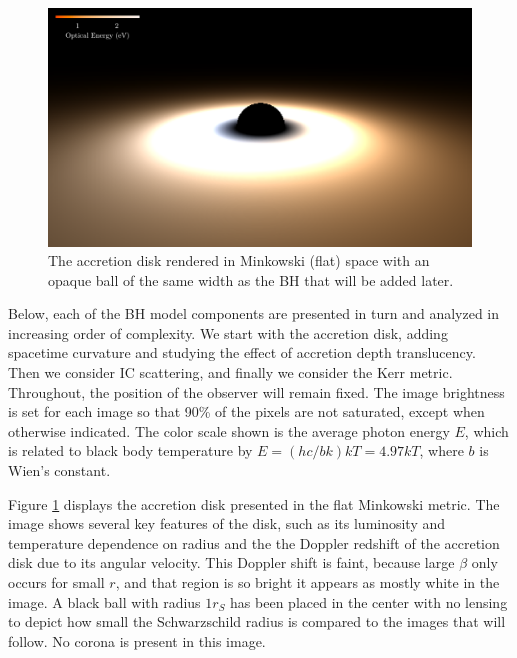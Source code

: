\documentclass[twocolumn,twocolappendix]{aastex631}
\begin{document}
\begin{figure}[htbp!]
  \centering
  \includegraphics[width=\linewidth]{../imager/small/minkowski-optical.pdf}
  \caption{The accretion disk rendered in Minkowski (flat) space with an opaque ball of the same width as the BH that will be added later.}
  \label{fig:mink}
\end{figure}

Below, each of the BH model components are presented in turn and analyzed in increasing order of complexity. We start with the accretion disk, adding spacetime curvature and studying the effect of accretion depth translucency. Then we consider IC scattering, and finally we consider the Kerr metric. Throughout, the position of the observer will remain fixed. The image brightness is set for each image so that 90\% of the pixels are not saturated, except when otherwise indicated. The color scale shown is the average photon energy $E$, which is related to black body temperature by $E = (hc/bk)kT = 4.97 kT$, where $b$ is Wien's constant.

Figure \ref{fig:mink} displays the accretion disk presented in the flat Minkowski metric. The image shows several key features of the disk, such as its luminosity and temperature dependence on radius and the the Doppler redshift of the accretion disk due to its angular velocity. This Doppler shift is faint, because large $\beta$ only occurs for small $r$, and that region is so bright it appears as mostly white in the image. A black ball with radius $1 r_S$ has been placed in the center with no lensing to depict how small the Schwarzschild radius is compared to the images that will follow. No corona is present in this image.
\end{document}
